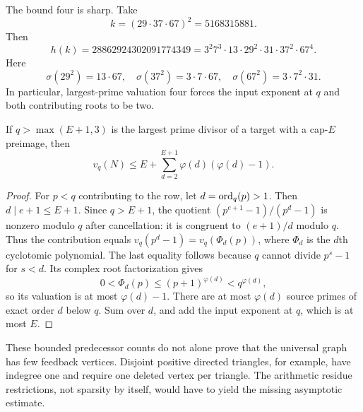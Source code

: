 The bound four is sharp. Take
\[
 k=(29\cdot37\cdot67)^2=5168315881.
\]
Then
\[
 h(k)=28862924302091774349
 =3^2 7^3\cdot13\cdot29^2\cdot31\cdot37^2\cdot67^4.
\]
Here
\[
 \sigma(29^2)=13\cdot67,\quad
 \sigma(37^2)=3\cdot7\cdot67,\quad
 \sigma(67^2)=3\cdot7^2\cdot31.
\]
In particular, largest-prime valuation four forces the input exponent at $q$ and both contributing roots to be two.

\begin{proposition}
If $q>\max(E+1,3)$ is the largest prime divisor of a target with a cap-$E$ preimage, then
\[
 v_q(N)\le E+\sum_{d=2}^{E+1}\varphi(d)(\varphi(d)-1).
\]
\end{proposition}
\begin{proof}
For $p<q$ contributing to the row, let $d=\operatorname{ord}_q(p)>1$. Then $d\mid e+1\le E+1$. Since $q>E+1$, the quotient $(p^{e+1}-1)/(p^d-1)$ is nonzero modulo $q$ after cancellation: it is congruent to $(e+1)/d$ modulo $q$. Thus the contribution equals $v_q(p^d-1)=v_q(\Phi_d(p))$, where $\Phi_d$ is the $d$th cyclotomic polynomial. The last equality follows because $q$ cannot divide $p^s-1$ for $s<d$. Its complex root factorization gives
\[
 0<\Phi_d(p)\le(p+1)^{\varphi(d)}<q^{\varphi(d)},
\]
so its valuation is at most $\varphi(d)-1$. There are at most $\varphi(d)$ source primes of exact order $d$ below $q$. Sum over $d$, and add the input exponent at $q$, which is at most $E$.
\end{proof}

These bounded predecessor counts do not alone prove that the universal graph has few feedback vertices. Disjoint positive directed triangles, for example, have indegree one and require one deleted vertex per triangle. The arithmetic residue restrictions, not sparsity by itself, would have to yield the missing asymptotic estimate.


